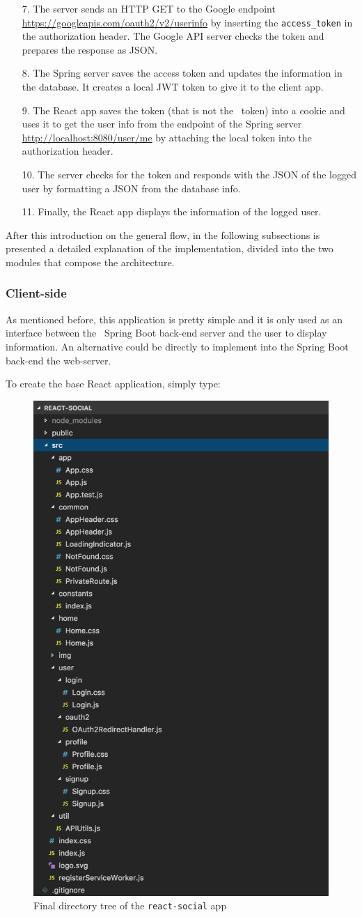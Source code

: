 \begin{enumerate}
    \item[7.] The server sends an HTTP GET to the Google endpoint \url{https://googleapis.com/oauth2/v2/userinfo} by inserting the \texttt{access\_token} in the authorization header. The Google API server checks the token and prepares the response as JSON.
    \item[8.] The Spring server saves the access token and updates the information in the database. It creates a local JWT token to give it to the client app.
    \item[9.] The React app saves the token  (that is not the \oauth\ token) into a cookie and uses it to get the user info from the endpoint of the Spring server \url{http://localhost:8080/user/me} by attaching the local token into the authorization header.
    \item[10.] The server checks for the token and responds with the JSON of the logged user by formatting a JSON from the database info.
    \item[11.] Finally, the React app displays the information of the logged user.
\end{enumerate}

After this introduction on the general flow, in the following subsections is presented a detailed explanation of the implementation, divided into the two modules that compose the architecture.

\subsubsection{Client-side}
As mentioned before, this application is pretty simple and it is only used as an interface between the \oauth\ Spring Boot back-end server and the user to display information. An alternative could be directly to implement into the Spring Boot back-end the web-server.

\noindent To create the base React application, simply type:

\begin{figure}
  \begin{center}
    \includegraphics[width=0.30 \textwidth]{chapters/images/chp6/dirreact.jpg}
  \end{center}
  \caption{Final directory tree of the \texttt{react-social} app}
  \label{fig:dirtree}
\end{figure}

